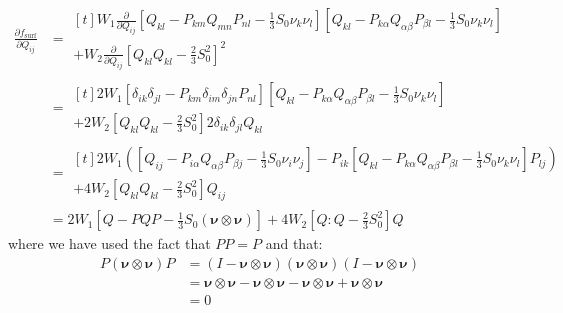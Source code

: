 \documentclass[reqno]{article}
\newcommand{\fs}{f_\text{surf}}
\begin{document}
\begin{equation}
\begin{split}
    \frac{\partial \fs}{\partial Q_{ij}}
    &=
    \begin{multlined}[t]
        W_1
        \frac{\partial}{\partial Q_{ij}}
        \left[ Q_{kl} - P_{km} Q_{mn} P_{nl} - \frac13 S_0 \nu_k \nu_l\right] 
        \left[ Q_{kl} - P_{k\alpha} Q_{\alpha \beta} P_{\beta l} - \frac13 S_0 \nu_k \nu_l\right] \\
        + 
        W_2 
        \frac{\partial}{\partial Q_{ij}}
        \left[ Q_{kl} Q_{kl} - \frac23 S_0^2 \right]^2
    \end{multlined} \\
    &=
    \begin{multlined}[t]
        2 W_1 \left[ \delta_{ik} \delta_{jl} - P_{km} \delta_{im} \delta_{jn} P_{nl} \right]
        \left[ Q_{kl} - P_{k\alpha} Q_{\alpha \beta} P_{\beta l} - \frac13 S_0 \nu_k \nu_l\right] \\
        + 
        2 W_2 \left[ Q_{kl} Q_{kl} - \frac23 S_0^2 \right] 2 \delta_{ik} \delta_{jl} Q_{kl}
    \end{multlined} \\
    &=
    \begin{multlined}[t]
        2 W_1 \left(
        \left[ Q_{ij} - P_{i\alpha} Q_{\alpha \beta} P_{\beta j} - \frac13 S_0 \nu_i \nu_j\right]
        - P_{ik} \left[ Q_{kl} - P_{k\alpha} Q_{\alpha \beta} P_{\beta l} - \frac13 S_0 \nu_k \nu_l\right] P_{lj}
        \right) \\
        + 
        4 W_2 \left[ Q_{kl} Q_{kl} - \frac23 S_0^2 \right] Q_{ij}
    \end{multlined} \\
    &=
    2 W_1 \left[ Q - PQP - \frac13 S_0 \left( \boldsymbol\nu \otimes \boldsymbol\nu \right) \right]
    + 4 W_2 \left[ Q : Q - \frac23 S_0^2 \right] Q
\end{split}
\end{equation}
where we have used the fact that $PP = P$ and that:
\begin{equation}
\begin{split}
    P \left( \boldsymbol{\nu} \otimes \boldsymbol{\nu} \right) P
    &= 
    \left(I - \boldsymbol{\nu} \otimes \boldsymbol{\nu}\right)
    \left( \boldsymbol{\nu} \otimes \boldsymbol{\nu} \right)
    \left(I - \boldsymbol{\nu} \otimes \boldsymbol{\nu}\right) \\
    &=
    \boldsymbol{\nu} \otimes \boldsymbol{\nu}
    - \boldsymbol{\nu} \otimes \boldsymbol{\nu}
    - \boldsymbol{\nu} \otimes \boldsymbol{\nu}
    + \boldsymbol{\nu} \otimes \boldsymbol{\nu} \\
    &=
    0
\end{split}
\end{equation}
\end{document}
